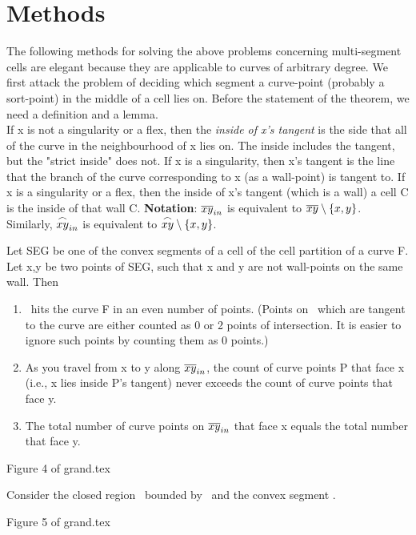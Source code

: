 \section{Methods}
The following methods for solving the above problems concerning
multi-segment cells are elegant because they are applicable to curves of
arbitrary degree.
We first attack the problem of deciding which segment a curve-point 
(probably a sort-point) in the middle of a cell lies on.
Before the statement of the theorem, we need a definition and a lemma.
\\  If x is not a singularity or a flex, then the {\em inside of x's
tangent} is the side that all of the curve in the neighbourhood of x lies on.
The inside includes the tangent, but the "strict inside" does not.
If x is a singularity, then x's tangent is the line that the branch of the 
curve corresponding to x (as a wall-point) is tangent to.
If x is a singularity or a flex, then the inside of x's tangent (which is
 a wall) \wrt a cell C is the inside of that wall \wrt C.
{\bf Notation}: $\mbox{$\overline{xy}$}_{in}$ is equivalent to $\mbox{$\overline{xy}$} \setminus \{x,y\}$.
Similarly, $\mbox{$\stackrel{\frown}{xy}$}_{in}$ is equivalent to $\mbox{$\stackrel{\frown}{xy}$} \setminus \{x,y\}$.
\begin{lemma}\nopagebreak
\label{alpha}
Let SEG be one of the convex segments of a cell of the cell partition of a
curve F.
Let x,y be two points of SEG, such that x and y are not wall-points on the
same wall.
Then
\begin{enumerate}
\item  {}\ hits the curve F in an even number of points.
	(Points on \ which are tangent to the curve are either
	counted as 0 or 2 points of intersection.  It is easier to
	ignore such points by counting them as 0 points.)
\item  As you travel from x to y along $\mbox{$\overline{xy}$}_{in}$,
	the count of curve points P that face x (i.e., x lies
	inside P's tangent) never exceeds the count of curve points
	that face y.
\item  The total number of curve points on $\mbox{$\overline{xy}$}_{in}$
        that face x equals the total
	number that face y.
\end{enumerate}
\begin{center}
Figure 4 of grand.tex
\end{center}
\end{lemma}
\proof
Consider the closed region \Rxy\ bounded by \ and the convex segment
.
\begin{center}
Figure 5 of grand.tex
\end{center}
